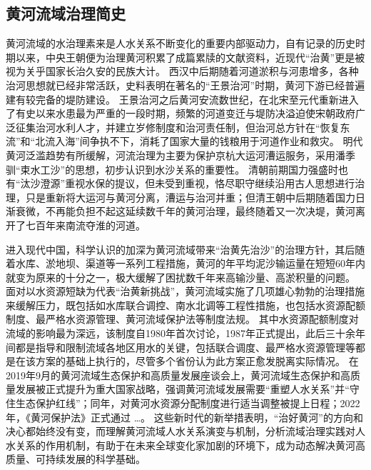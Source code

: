 \subsection{黄河流域治理简史}

黄河流域的水治理素来是人水关系不断变化的重要内部驱动力，自有记录的历史时期以来，中央王朝便为治理黄河积累了成篇累牍的文献资料，近现代“治黄”更是被视为关乎国家长治久安的民族大计。
西汉中后期随着河道淤积与河患增多，各种治河思想就已经非常活跃，史料表明在著名的“王景治河”时期，黄河下游已经普遍建有较完备的堤防建设。
王景治河之后黄河安流数世纪，在北宋至元代重新进入了有史以来水患最为严重的一段时期，频繁的河道变迁与堤防决溢迫使宋朝政府广泛征集治河水利人才，并建立岁修制度和治河责任制，但治河总方针在“恢复东流”和“北流入海”间争执不下，消耗了国家大量的钱粮用于河道作业和救灾。
明代黄河泛滥趋势有所缓解，河流治理为主要为保护京杭大运河漕运服务，采用潘季驯“束水工沙”的思想，初步认识到水沙关系的重要性。
清朝前期国力强盛时也有“汰沙澄源”重视水保的提议，但未受到重视，恪尽职守继续沿用古人思想进行治理，只是重新将大运河与黄河分离，漕运与治河并重；但清王朝中后期随着国力日渐衰微，不再能负担不起这延续数千年的黄河治理，最终随着又一次决堤，黄河离开了七百年来南流夺淮的河道。


进入现代中国，科学认识的加深为黄河流域带来“治黄先治沙”的治理方针，其后随着水库、淤地坝、渠道等一系列工程措施，黄河的年平均泥沙输运量在短短$60$年内就变为原来的十分之一，极大缓解了困扰数千年来高输沙量、高淤积量的问题。
面对以水资源短缺为代表“治黄新挑战”，黄河流域实施了几项雄心勃勃的治理措施来缓解压力，既包括如水库联合调控、南水北调等工程性措施，也包括水资源配额制度、最严格水资源管理、黄河流域保护法等制度法规。
其中水资源配额制度对流域的影响最为深远，该制度自1980年首次讨论，1987年正式提出，此后三十余年间都是指导和限制流域各地区用水的关键，包括联合调度、最严格水资源管理等都是在该方案的基础上执行的，尽管多个省份认为此方案正愈发脱离实际情况。
在2019年9月的黄河流域生态保护和高质量发展座谈会上，黄河流域生态保护和高质量发展被正式提升为重大国家战略，强调黄河流域发展需要“重塑人水关系”并“守住生态保护红线”；同年，对黄河水资源分配制度进行适当调整被提上日程；2022年，《黄河保护法》正式通过 \ldots。
这些新时代的新举措表明，“治好黄河”的方向和决心都始终没有变，而理解黄河流域人水关系演变与机制，分析流域治理实践对人水关系的作用机制，有助于在未来全球变化家加剧的环境下，成为动态解决黄河高质量、可持续发展的科学基础。
